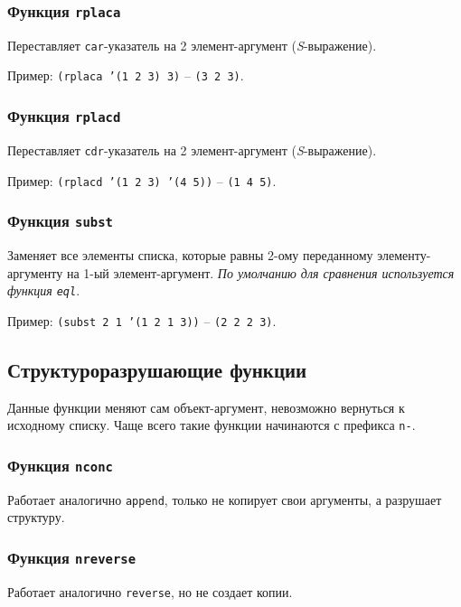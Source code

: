 \subsubsection{Функция \texttt{rplaca}}

Переставляет \texttt{car}-указатель на 2 элемент-аргумент (\textit{S}-выражение).

Пример: \texttt{(rplaca '(1 2 3) 3)} -- \texttt{(3 2 3)}.

\subsubsection{Функция \texttt{rplacd}}

Переставляет \texttt{cdr}-указатель на 2 элемент-аргумент (\textit{S}-выражение).

Пример: \texttt{(rplacd '(1 2 3) '(4 5))} -- \texttt{(1 4 5)}.

\subsubsection{Функция \texttt{subst}}

Заменяет все элементы списка, которые равны 2-ому переданному элементу-аргументу на 1-ый элемент-аргумент. \textit{По умолчанию для сравнения используется функция \texttt{eql}}.

Пример: \texttt{(subst 2 1 '(1 2 1 3))} -- \texttt{(2 2 2 3)}.

\subsection{Структуроразрушающие функции}

Данные функции меняют сам объект-аргумент, невозможно вернуться к исходному списку. Чаще всего такие функции начинаются с префикса \texttt{n-}.

\subsubsection{Функция \texttt{nconc}}

Работает аналогично \texttt{append}, только не копирует свои аргументы, а разрушает структуру.

\subsubsection{Функция \texttt{nreverse}}

Работает аналогично \texttt{reverse}, но не создает копии.

